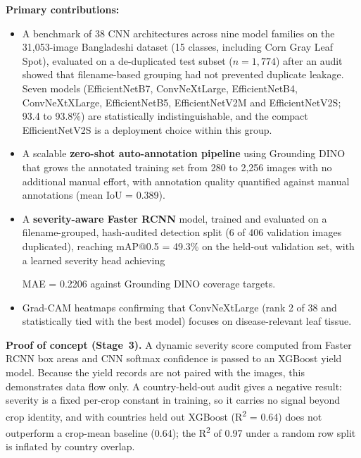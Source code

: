 \noindent\textbf{Primary contributions:}
\begin{itemize}[noitemsep]
  \item A benchmark of 38 CNN architectures across nine model families on the 31,053-image Bangladeshi dataset (15 classes, including Corn Gray Leaf Spot), evaluated on a de-duplicated test subset ($n=1{,}774$) after an audit showed that filename-based grouping had not prevented duplicate leakage. Seven models (EfficientNetB7, ConvNeXtLarge, EfficientNetB4, ConvNeXtXLarge, EfficientNetB5, EfficientNetV2M and EfficientNetV2S; 93.4 to 93.8\%) are statistically indistinguishable, and the compact EfficientNetV2S is a deployment choice within this group.
  \item A scalable \textbf{zero-shot auto-annotation pipeline} using
    Grounding DINO that grows the annotated training set from 280 to
    2,256 images with no additional manual effort, with annotation
    quality quantified against manual annotations (mean IoU = 0.389).
  \item A \textbf{severity-aware Faster RCNN} model, trained and
    evaluated on a filename-grouped, hash-audited detection split
    (6 of 406 validation images duplicated), reaching mAP@0.5 = 49.3\% on the held-out validation set,
    with a learned severity head achieving
    
    MAE = 0.2206 against Grounding DINO coverage targets.
  \item Grad-CAM heatmaps confirming that ConvNeXtLarge (rank 2 of 38 and statistically tied with the best model) focuses on disease-relevant leaf tissue.
\end{itemize}

\noindent\textbf{Proof of concept (Stage~3).} A dynamic severity score
computed from Faster RCNN box areas and CNN softmax confidence is passed to
an XGBoost yield model. Because the yield records are not paired with the
images, this demonstrates data flow only. A country-held-out audit gives a
negative result: severity is a fixed per-crop constant in training, so it
carries no signal beyond crop identity, and with countries held out XGBoost
(R\textsuperscript{2} = 0.64) does not outperform a crop-mean baseline
(0.64); the R\textsuperscript{2} of 0.97 under a random row split is
inflated by country overlap.
